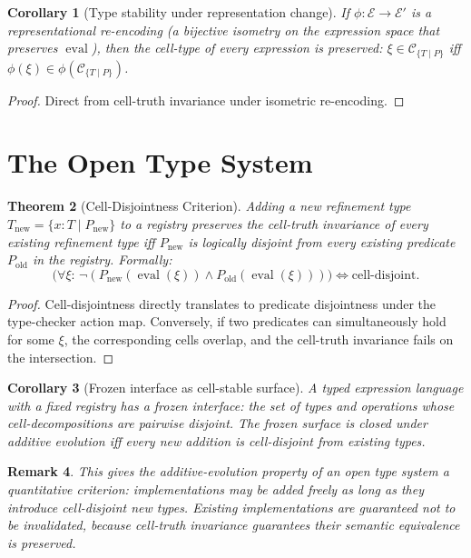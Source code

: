 \documentclass[twocolumn,11pt,a4paper]{article}
\newtheorem{theorem}{Theorem}[section]
\newtheorem{corollary}[theorem]{Corollary}
\newtheorem{remark}[theorem]{Remark}
\DeclareMathOperator{\eval}{eval}
\newcommand{\Cell}{\mathcal{C}}
\begin{document}
\begin{corollary}[Type stability under representation change]
\label{cor:type-stability}
If $\phi : \mathcal{E} \to \mathcal{E}'$ is a representational re-encoding (a bijective isometry on the expression space that preserves $\eval$), then the cell-type of every expression is preserved: $\xi \in \Cell_{\{T \mid P\}}$ iff $\phi(\xi) \in \phi(\Cell_{\{T \mid P\}})$.
\end{corollary}

\begin{proof}
Direct from cell-truth invariance under isometric re-encoding.
\end{proof}

\section{The Open Type System}
\label{sec:open-types}

\begin{theorem}[Cell-Disjointness Criterion]
\label{thm:cell-disjoint}
Adding a new refinement type $T_{\mathrm{new}} = \{x : T \mid P_{\mathrm{new}}\}$ to a registry preserves the cell-truth invariance of every existing refinement type iff $P_{\mathrm{new}}$ is logically disjoint from every existing predicate $P_{\mathrm{old}}$ in the registry. Formally:
\[
\bigl(\forall \xi : \, \neg(P_{\mathrm{new}}(\eval(\xi)) \wedge P_{\mathrm{old}}(\eval(\xi)))\bigr) \iff \mathrm{cell\text{-}disjoint}.
\]
\end{theorem}

\begin{proof}
Cell-disjointness directly translates to predicate disjointness under the type-checker action map. Conversely, if two predicates can simultaneously hold for some $\xi$, the corresponding cells overlap, and the cell-truth invariance fails on the intersection.
\end{proof}

\begin{corollary}[Frozen interface as cell-stable surface]
\label{cor:frozen-interface}
A typed expression language with a fixed registry has a \emph{frozen interface}: the set of types and operations whose cell-decompositions are pairwise disjoint. The frozen surface is closed under additive evolution iff every new addition is cell-disjoint from existing types.
\end{corollary}

\begin{remark}
This gives the additive-evolution property of an open type system a quantitative criterion: implementations may be added freely as long as they introduce cell-disjoint new types. Existing implementations are guaranteed not to be invalidated, because cell-truth invariance guarantees their semantic equivalence is preserved.
\end{remark}
\end{document}
